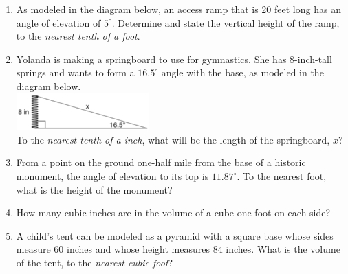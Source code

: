 \documentclass[12pt, twoside]{article}
\begin{document}
\begin{enumerate}
\item As modeled in the diagram below, an access ramp that is 20 feet long has an angle of elevation of $5^\circ$. Determine and state the vertical height of the ramp, to the \emph{nearest tenth of a foot}.\\[0.3cm]
 \vspace{3cm}

\item Yolanda is making a springboard to use for gymnastics. She has 8-inch-tall springs and wants to form a $16.5^\circ$ angle with the base, as modeled in the diagram below.\\[0.3cm]
  \includegraphics[width=0.4\textwidth]{spring_Aug2018-6.png}\\
To the \emph{nearest tenth of a inch}, what will be the length of the springboard, $x$?
  \vspace{0.5cm}


  \item From a point on the ground one-half mile from the base of a historic monument, the angle of elevation to its top is $11.87^\circ$. To the nearest foot, what is the height of the monument?\\[1cm]
     \vspace{3cm}

\newpage
  \item How many cubic inches are in the volume of a cube one foot on each side?

  \item A child’s tent can be modeled as a pyramid with a square base whose sides measure 60 inches and whose height measures 84 inches. What is the volume of the tent, to the \emph{nearest cubic foot}?


\end{enumerate}
\end{document}
